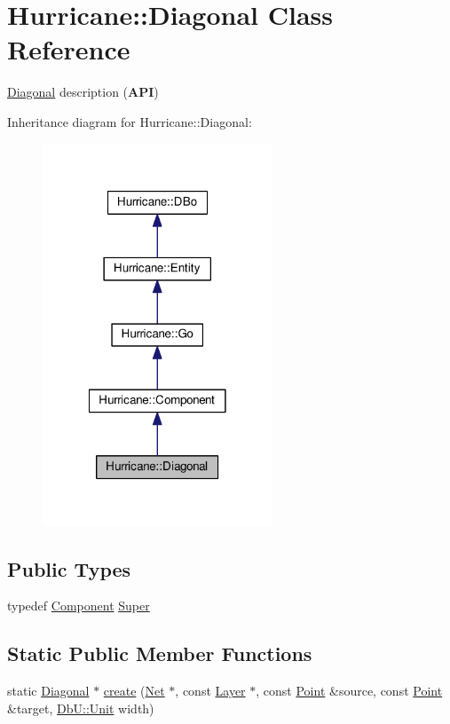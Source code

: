 \hypertarget{classHurricane_1_1Diagonal}{}\section{Hurricane\+:\+:Diagonal Class Reference}
\label{classHurricane_1_1Diagonal}


\mbox{\hyperlink{classHurricane_1_1Diagonal}{Diagonal}} description ({\bfseries A\+PI})  




Inheritance diagram for Hurricane\+:\+:Diagonal\+:\nopagebreak
\begin{figure}[H]
\begin{center}
\leavevmode
\includegraphics[width=194pt]{classHurricane_1_1Diagonal__inherit__graph}
\end{center}
\end{figure}
\subsection*{Public Types}
\begin{DoxyCompactItemize}
\item 
typedef \mbox{\hyperlink{classHurricane_1_1Component}{Component}} \mbox{\hyperlink{classHurricane_1_1Diagonal_aef5120a04b3b4db78b118e8c5daade90}{Super}}
\end{DoxyCompactItemize}
\subsection*{Static Public Member Functions}
\begin{DoxyCompactItemize}
\item 
static \mbox{\hyperlink{classHurricane_1_1Diagonal}{Diagonal}} $\ast$ \mbox{\hyperlink{classHurricane_1_1Diagonal_a83cd4332e78515e2c3745fd017e7441f}{create}} (\mbox{\hyperlink{classHurricane_1_1Net}{Net}} $\ast$, const \mbox{\hyperlink{classHurricane_1_1Layer}{Layer}} $\ast$, const \mbox{\hyperlink{classHurricane_1_1Point}{Point}} \&source, const \mbox{\hyperlink{classHurricane_1_1Point}{Point}} \&target, \mbox{\hyperlink{group__DbUGroup_ga4fbfa3e8c89347af76c9628ea06c4146}{Db\+U\+::\+Unit}} width)
\end{DoxyCompactItemize}
